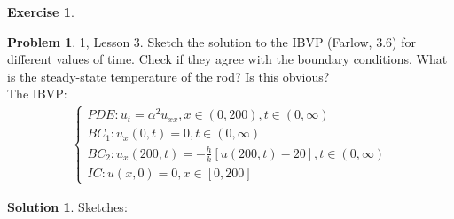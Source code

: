\documentclass{article}
\theoremstyle{definition}
\newtheorem{sln}{Solution}[section]
\newtheorem*{prob*}{Problem}
\newtheorem{exer}{Exercise}[section]
\begin{document}
\begin{exer}
	\begin{prob*}1, Lesson 3. Sketch the solution to the IBVP (Farlow, 3.6) for different values of time. Check if they agree with the boundary conditions. What is the steady-state temperature of the rod? Is this obvious?\\
		
		The IBVP:
		\begin{align*}
		\begin{cases}
		PDE: u_t = \alpha^2 u_{xx}, x\in(0,200), t\in(0,\infty)\\
		BC_1: u_x(0,t) = 0, t\in(0,\infty)\\
		BC_2: u_x(200,t) = -\frac{h}{k}[u(200,t) - 20], t\in(0,\infty)\\
		IC: u(x,0) = 0, x\in[0,200]
		\end{cases}
		\end{align*}
		\begin{sln}
			Sketches:\\\\\\\\\\\\\\\\\\\\\\\\\\\\\\\\\\\\\\\\\\\\\\\\\\\\\\\\
			

\end{sln}
\end{prob*}
\end{exer}
\end{document}
